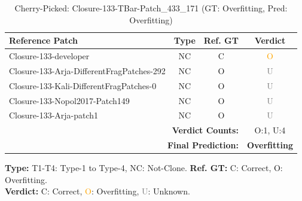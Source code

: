 \begin{table}[t]
\centering
\caption{Cherry-Picked: Closure-133-TBar-Patch\_433\_171 (GT: Overfitting, Pred: Overfitting)}
\label{tab:cherry-Closure133TBarPatch433171}
\footnotesize
\renewcommand{\arraystretch}{1.1}
\setlength{\tabcolsep}{4pt}
\begin{tabular}{l|c|c|c}
\hline
\textbf{Reference Patch} & \textbf{Type} & \textbf{Ref. GT} & \textbf{Verdict} \\
\hline
Closure-133-developer & NC & C & \textcolor{orange}{O} \\
Closure-133-Arja-DifferentFragPatches-292 & NC & O & \textcolor{gray}{U} \\
Closure-133-Kali-DifferentFragPatches-0 & NC & O & \textcolor{gray}{U} \\
Closure-133-Nopol2017-Patch149 & NC & O & \textcolor{gray}{U} \\
Closure-133-Arja-patch1 & NC & O & \textcolor{gray}{U} \\
\hline
\multicolumn{3}{r|}{\textbf{Verdict Counts:}} & O:1, U:4 \\
\multicolumn{3}{r|}{\textbf{Final Prediction:}} & \textbf{Overfitting} \\
\hline
\end{tabular}
\vspace{1mm}
\parbox{\linewidth}{\centering\footnotesize 
\vspace{1mm}
\textbf{Type:} T1-T4: Type-1 to Type-4, NC: Not-Clone. \;
\textbf{Ref. GT:} C: Correct, O: Overfitting. \\
\textbf{Verdict:} \textcolor{green!60!black}{C}: Correct, \textcolor{orange}{O}: Overfitting, \textcolor{gray}{U}: Unknown.}
\end{table}


